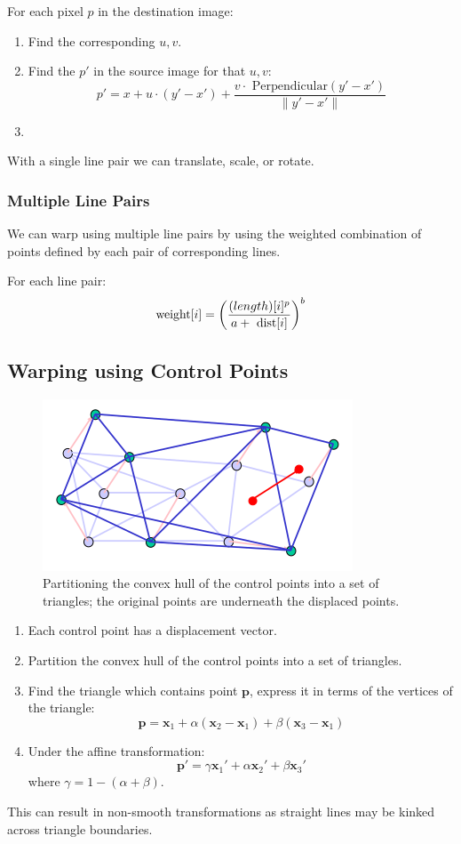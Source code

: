 \documentclass[11pt]{article}
\begin{document}
For each pixel $p$ in the destination image:
\begin{enumerate}
  \item Find the corresponding $u, v$.
  \item Find the $p'$ in the source image for that $u, v$:
    \[
      p' = x + u \cdot (y' - x') + \frac{v \cdot \text{ Perpendicular}(y'-x')}{\lVert y'-x' \rVert} 
    \]
  \item 
\end{enumerate}

With a single line pair we can translate, scale, or rotate.

\subsubsection{Multiple Line Pairs}
We can warp using multiple line pairs by using the weighted combination of points defined by each pair of corresponding lines.

For each line pair:
\[
  \text{weight}[i] = \left( \frac{\text(length)[i]^p}{a + \text{ dist}[i]} \right)^b 
\]

\subsection{Warping using Control Points}
\begin{figure}[htb!]
  \centering
  \caption{Partitioning the convex hull of the control points into a set of triangles; the original points are underneath the displaced points.}
  \includegraphics[scale=0.5]{controlpoints}
\end{figure}
\begin{enumerate}
  \item Each control point has a displacement vector.
  \item Partition the convex hull of the control points into a set of triangles.
  \item Find the triangle which contains point $\bm{p}$, express it in terms of the vertices of the triangle:
    \[
      \bm{p} = \bm{x}_1 + \alpha(\bm{x}_2 - \bm{x}_1) + \beta(\bm{x}_3 - \bm{x}_1)
    \]
  \item Under the affine transformation:
    \[
      \bm{p}' = \gamma\bm{x}_1' + \alpha\bm{x}_2' + \beta\bm{x}_3' 
    \]
    where $\gamma = 1 - (\alpha + \beta)$.
\end{enumerate}
This can result in non-smooth transformations as straight lines may be kinked across triangle boundaries.
\end{document}
